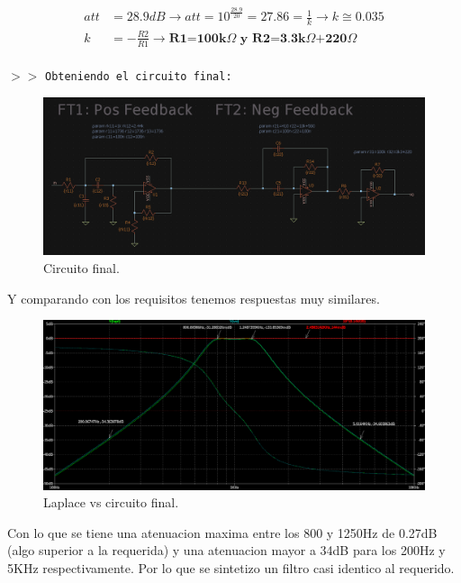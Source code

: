 \begin{align*}
    att &= 28.9dB \longrightarrow att = 10^{\frac{28.9}{20}} = 27.86 = \frac{1}{k} \longrightarrow k \cong 0.035 \\
    k &= - \frac{R2}{R1} \longrightarrow \textbf{R1=100k$\Omega$ y R2=3.3k$\Omega$+220$\Omega$}
\end{align*} \\

\noindent $>>$ \texttt{Obteniendo el circuito final:}

\begin{figure}[H]
    \centering
    \includegraphics[scale=.35]{Secciones/Circ1/img/schBPFinal.png}
    \caption{Circuito final.}
    \label{schPos}
\end{figure}

Y comparando con los requisitos tenemos respuestas muy similares.

\begin{figure}[H]
    \centering
    \includegraphics[scale=.3]{Secciones/Circ1/img/lpVsBPFinal.png}
    \caption{Laplace vs circuito final.}
    \label{schPos}
\end{figure}

Con lo que se tiene una atenuacion maxima entre los 800 y 1250Hz de 0.27dB (algo superior a la requerida) y una atenuacion mayor a 34dB para los 200Hz y 5KHz respectivamente. Por lo que se sintetizo un filtro casi identico al requerido.